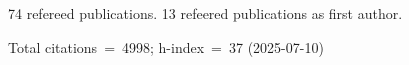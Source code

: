 74 refereed publications. 13 refeered publications as first author.

Total citations~=~4998; h-index~=~37 (2025-07-10)